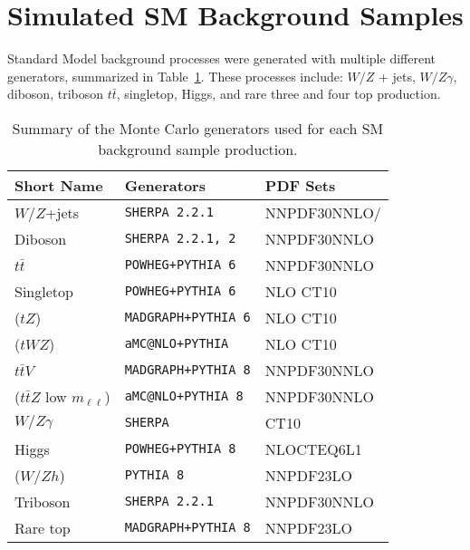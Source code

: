  \section{Simulated SM Background Samples}
 \label{sec:simbkg}
 Standard Model background processes were generated with multiple different generators, summarized in Table~\ref{tab:summarySMMC}.  These processes include: $W/Z$ + jets, $W/Z\gamma$, diboson, triboson $t\bar t$, singletop, Higgs, and rare three and four top production.   %
 
 \begin{table}[tbp]
\centering
\begin{tabular}{lll}
\hline
Short Name       & Generators & PDF Sets\\
\hline
\hline
$W/Z$+jets & \texttt{SHERPA 2.2.1} & NNPDF30NNLO/\\
\hline
Diboson &   \texttt{SHERPA 2.2.1, 2} & NNPDF30NNLO\\
\hline
$t\bar{t}$ & \texttt{POWHEG+PYTHIA 6} & NNPDF30NNLO\\
\hline
Singletop & \texttt{POWHEG+PYTHIA 6} & NLO CT10\\
 ($tZ$)& \texttt{MADGRAPH+PYTHIA 6} & NLO CT10\\
 ($tWZ$)& \texttt{aMC@NLO+PYTHIA} & NLO CT10\\
\hline 
$t\bar{t}V$ &  \texttt{MADGRAPH+PYTHIA 8} & NNPDF30NNLO\\
($t\bar{t}Z$ low $m_{\ell\ell}$) & \texttt{aMC@NLO+PYTHIA 8} & NNPDF30NNLO\\
\hline
$W/Z\gamma$ & \texttt{SHERPA} & CT10\\
\hline
Higgs &  \texttt{POWHEG+PYTHIA 8} & NLOCTEQ6L1\\
 ($W/Zh$)& \texttt{PYTHIA 8} & NNPDF23LO\\
\hline
Triboson &  \texttt{SHERPA 2.2.1} & NNPDF30NNLO\\
\hline
Rare top &  \texttt{MADGRAPH+PYTHIA 8} & NNPDF23LO\\
\hline
\end{tabular}
\caption{Summary of the Monte Carlo generators used for each SM background sample production.}
\label{tab:summarySMMC}
\end{table}

